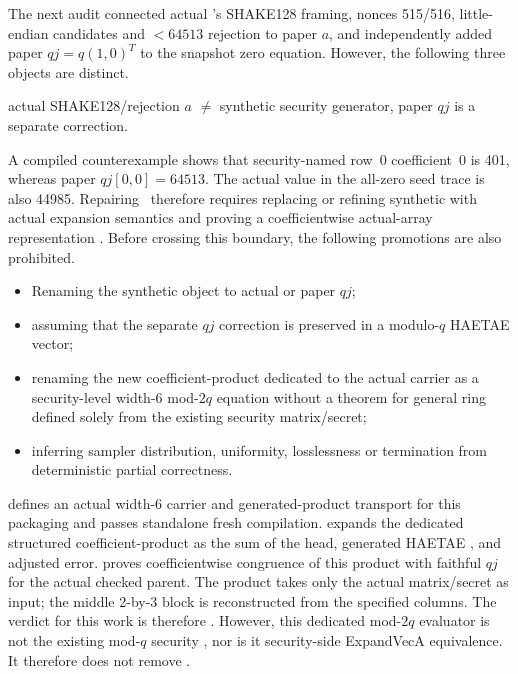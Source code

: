 The next audit connected actual 's SHAKE128 framing, nonces
515/516, little-endian candidates and \(<64513\) rejection to paper \(a\), and
independently added paper \(qj=q(1,0)^T\) to the snapshot zero equation.
However, the following three objects are distinct.

\begin{center}
actual SHAKE128/rejection \(a\)
\(\neq\) synthetic security generator,
\qquad paper \(qj\) is a separate correction.
\end{center}

A compiled counterexample shows that security-named row~0 coefficient~0 is 401,
whereas paper \(qj[0,0]=64513\). The actual value in the all-zero seed trace is
also 44985. Repairing \CurrentGate\ therefore requires replacing or refining
synthetic  with actual expansion semantics
and proving a coefficientwise actual-array representation
\cite{post-freeze-kg-actual-avec-qj-report}. Before crossing this boundary, the
following promotions are also prohibited.

\begin{itemize}
  \item Renaming the synthetic object to actual  or paper \(qj\);
  \item assuming that the separate \(qj\) correction is preserved in a modulo-\(q\)
        HAETAE vector;
  \item renaming the new coefficient-product dedicated to the actual carrier
        as a security-level width-6 mod-\(2q\) equation without a theorem for
        general ring  defined solely from the existing
        security matrix/secret;
  \item inferring sampler distribution, uniformity, losslessness or termination
        from deterministic partial correctness.
\end{itemize}

 defines an actual width-6 carrier and
generated-product transport for this packaging and passes standalone fresh
compilation.  expands the
dedicated structured coefficient-product as the sum of the head, generated
HAETAE , and adjusted error.
proves coefficientwise congruence of this product with faithful \(qj\) for the
actual checked parent. The product takes only the actual matrix/secret as input;
the middle 2-by-3 block is  reconstructed from the specified
columns. The verdict for this work is therefore \FaithfulAugmentedVerdict.
However, this dedicated mod-\(2q\) evaluator is not the existing mod-\(q\)
security , nor is it security-side ExpandVecA
equivalence. It therefore does not remove \CurrentGate.

